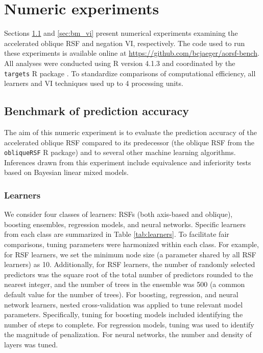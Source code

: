 \documentclass[twoside,11pt]{article}\usepackage[]{graphicx}\usepackage[]{xcolor}
\newcommand{\tabref}[1]{Table \ref{#1}}
\begin{document}
\section{Numeric experiments} \label{sec:numeric}



Sections \ref{sec:bm_pred} and \ref{sec:bm_vi} present numerical experiments examining the accelerated oblique RSF and negation VI, respectively. The code used to run these experiments is available online at \href{https://github.com/bcjaeger/aorsf-bench}{https://github.com/bcjaeger/aorsf-bench}. All analyses were conducted using R version 4.1.3 and coordinated by the \texttt{targets} R package \citep{targets}. To standardize comparisons of computational efficiency, all learners and VI techniques used up to 4 processing units.

\subsection{Benchmark of prediction accuracy} \label{sec:bm_pred}

The aim of this numeric experiment is to evaluate the prediction accuracy of the accelerated oblique RSF compared to its predecessor (the oblique RSF from the \texttt{obliqueRSF} R package) and to several other machine learning algorithms. Inferences drawn from this experiment include equivalence and inferiority tests based on Bayesian linear mixed models.

\subsubsection{Learners} \label{sec:learners}

We consider four classes of learners: RSFs (both axis-based and oblique), boosting ensembles, regression models, and neural networks. Specific learners from each class are summarized in \tabref{tab:learners}. To facilitate fair comparisons, tuning parameters were harmonized within each class. For example, for RSF learners, we set the minimum node size (a parameter shared by all RSF learners) as 10. Additionally, for RSF learners, the number of randomly selected predictors was the square root of the total number of predictors rounded to the nearest integer, and the number of trees in the ensemble was 500 (a common default value for the number of trees). For boosting, regression, and neural network learners, nested cross-validation was applied to tune relevant model parameters. Specifically, tuning for boosting models included identifying the number of steps to complete. For regression models, tuning was used to identify the magnitude of penalization. For neural networks, the number and density of layers was tuned.
\end{document}
